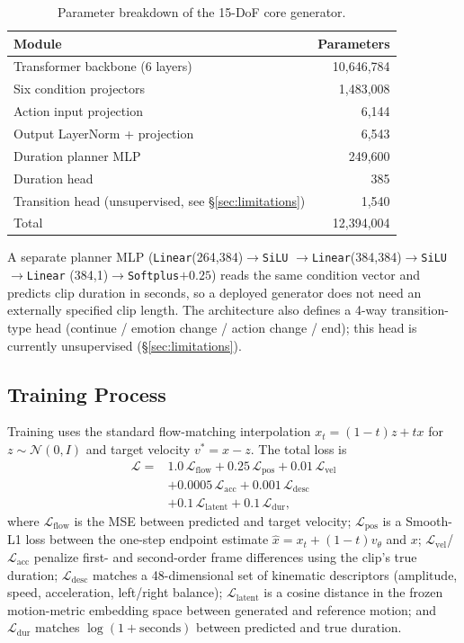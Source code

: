 \documentclass[conference]{IEEEtran}
\begin{document}
\begin{table}[t]
\centering
\caption{Parameter breakdown of the 15-DoF core generator.}
\label{tab:params}
\begin{tabular}{@{}lr@{}}
\toprule
Module & Parameters \\
\midrule
Transformer backbone (6 layers) & 10{,}646{,}784 \\
Six condition projectors & 1{,}483{,}008 \\
Action input projection & 6{,}144 \\
Output LayerNorm + projection & 6{,}543 \\
Duration planner MLP & 249{,}600 \\
Duration head & 385 \\
Transition head (unsupervised, see \S\ref{sec:limitations}) & 1{,}540 \\
\midrule
Total & 12{,}394{,}004 \\
\bottomrule
\end{tabular}
\end{table}

A separate planner MLP (\texttt{Linear}(264,384)$\to$\texttt{SiLU}
$\to$\texttt{Linear}(384,384)$\to$\texttt{SiLU}$\to$\texttt{Linear}
(384,1)$\to$\texttt{Softplus}$+0.25$) reads the same condition vector
and predicts clip duration in seconds, so a deployed generator does not
need an externally specified clip length. The architecture also defines
a 4-way transition-type head (continue / emotion change / action
change / end); this head is currently unsupervised (\S\ref{sec:limitations}).

\subsection{Training Process}
\label{sec:training}

Training uses the standard flow-matching interpolation $x_t =
(1-t)z + tx$ for $z\sim\mathcal N(0,I)$ and target velocity $v^\ast = x
- z$. The total loss is
\begin{equation}
\label{eq:loss}
\begin{aligned}
\mathcal{L} = {}& 1.0\,\mathcal{L}_{\text{flow}} + 0.25\,\mathcal{L}_{\text{pos}} + 0.01\,\mathcal{L}_{\text{vel}} \\
& + 0.0005\,\mathcal{L}_{\text{acc}} + 0.001\,\mathcal{L}_{\text{desc}} \\
& + 0.1\,\mathcal{L}_{\text{latent}} + 0.1\,\mathcal{L}_{\text{dur}},
\end{aligned}
\end{equation}
where $\mathcal{L}_{\text{flow}}$ is the MSE between predicted and
target velocity; $\mathcal{L}_{\text{pos}}$ is a Smooth-L1 loss between
the one-step endpoint estimate $\hat x = x_t + (1-t)v_\theta$ and $x$;
$\mathcal{L}_{\text{vel}}$/$\mathcal{L}_{\text{acc}}$ penalize first-
and second-order frame differences using the clip's true duration;
$\mathcal{L}_{\text{desc}}$ matches a 48-dimensional set of kinematic
descriptors (amplitude, speed, acceleration, left/right balance);
$\mathcal{L}_{\text{latent}}$ is a cosine distance in the frozen
motion-metric embedding space between generated and reference motion;
and $\mathcal{L}_{\text{dur}}$ matches $\log(1+\text{seconds})$ between
predicted and true duration.
\end{document}

